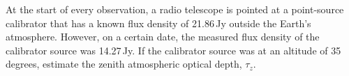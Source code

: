 At the start of every observation, a radio telescope is pointed at a
point-source calibrator that has a known flux density of 21.86\,Jy outside the
Earth's atmosphere. However, on a certain date, the measured flux density of
the calibrator source was 14.27\,Jy. If the calibrator source was at an
altitude of 35 degrees, estimate the zenith atmospheric optical depth,
$\tau_z$.
